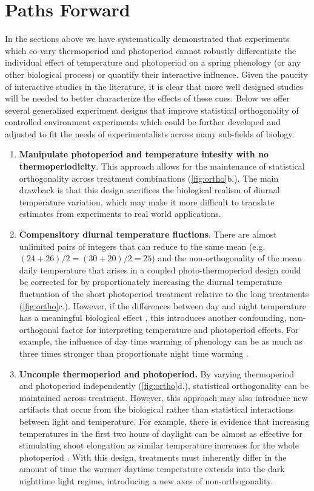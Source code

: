 \documentclass[11pt]{article}
\begin{document}
\section{Paths Forward}
In the sections above we have systematically demonstrated that experiments which co-vary thermoperiod and photoperiod cannot robustly differentiate the individual effect of temperature and photoperiod on a spring phenology (or any other biological process) or quantify their interactive influence. Given the paucity of interactive studies in the literature, it is clear that more well designed studies will be needed to better characterize the effects of these cues. Below we offer several generalized experiment designs that improve statistical orthogonality of controlled environment experiments which could be further developed and adjusted to fit the needs of experimentalists across many sub-fields of biology.
\begin{enumerate}
\item \textbf{Manipulate photoperiod and temperature intesity with no thermoperiodicity}. This approach allows for the maintenance of statistical orthogonality across treatment combinations (\ref{fig:ortho}b.). The main drawback is that this design sacrifices the biological realism of diurnal temperature variation, which may make it more difficult to translate estimates from experiments to real world applications.

\item \textbf{Compensitory diurnal temperature fluctions}. There are almost unlimited pairs of integers that can reduce to the same mean (e.g. $(24+26)/2 = (30+20)/2 = 25$) and the non-orthogonality of the mean daily temperature that arises in a coupled photo-thermoperiod design could be corrected for by proportionately increasing the diurnal temperature fluctuation of the short photoperiod treatment relative to the long treatments (\ref{fig:ortho}c.). However, if the differences between day and night temperature has a meaningful biological effect \citep{}, this introduces another confounding, non-orthogonal factor for interpreting temperature and photoperiod effects. For example, the influence of day time warming of phenology can be as much as three times stronger than proportionate night time warming \citep{Rossi2017}.

\item \textbf{Uncouple thermoperiod and photoperiod.} By varying thermoperiod and photoperiod independently (\ref{fig:ortho}d.), statistical orthogonality can be maintained across treatment. However, this approach may also introduce new artifacts that occur from the biological rather than statistical interactions between light and temperature. For example, there is evidence that increasing temperatures in the first two hours of daylight can be almost as effective for stimulating shoot elongation as similar temperature increases for the whole photoperiod \citep{Erwin1998}. With this design, treatments must inherently differ in the amount of time the warmer daytime temperature extends into the dark nighttime light regime, introducing a new axes of non-orthogonality.
\end{enumerate}
\end{document}
